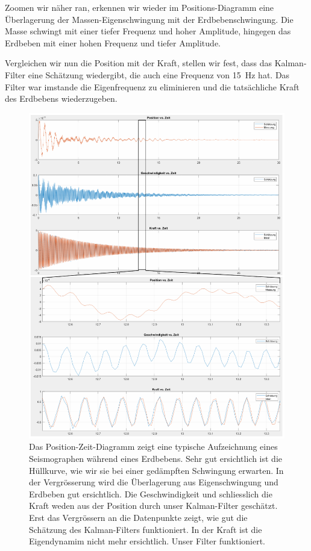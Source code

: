 Zoomen wir näher ran, erkennen wir wieder im Positions-Diagramm eine Überlagerung der Massen-Eigenschwingung mit der Erdbebenschwingung.
Die Masse schwingt mit einer tiefer Frequenz und hoher Amplitude, hingegen das Erdbeben mit einer hohen Frequenz und tiefer Amplitude.

Vergleichen wir nun die Position mit der Kraft, stellen wir fest, dass das Kalman-Filter eine Schätzung wiedergibt, die auch eine Frequenz von \SI{15}{\hertz} hat.
Das Filter war imstande die Eigenfrequenz zu eliminieren und die tatsächliche Kraft des Erdbebens wiederzugeben.

\begin{figure}
  \begin{center}
    \includegraphics[width=.95\linewidth,keepaspectratio]{papers/erdbeben/images/standard.PDF}
    \caption{
      Das Position-Zeit-Diagramm zeigt eine typische Aufzeichnung eines Seismographen während eines Erdbebens.
      Sehr gut ersichtlich ist die Hüllkurve, wie wir sie bei einer gedämpften Schwingung erwarten.
      In der Vergrösserung wird die Überlagerung aus Eigenschwingung und Erdbeben gut ersichtlich.
      Die Geschwindigkeit und schliesslich die Kraft weden aus der Position durch unser Kalman-Filter geschätzt.
      Erst das Vergrössern an die Datenpunkte zeigt, wie gut die Schätzung des Kalman-Filters funktioniert.
      In der Kraft ist die Eigendynamim nicht mehr ersichtlich. Unser Filter funktioniert.
      }
    \label{erdbeben:fig:standard-alles}
  \end{center}
\end{figure}

